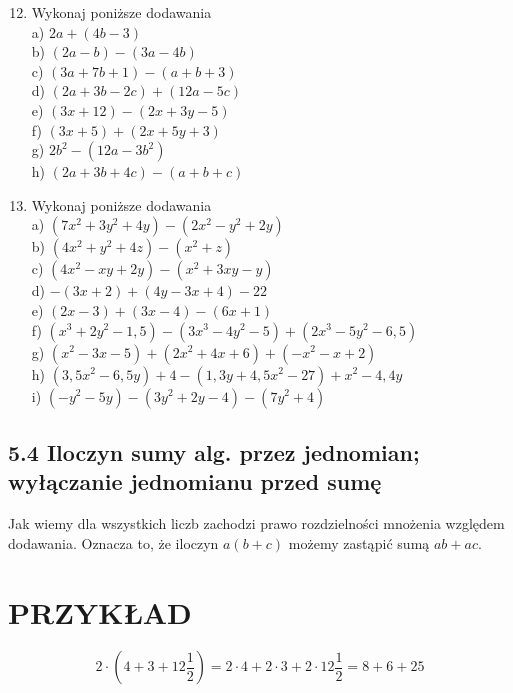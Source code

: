 \documentclass[10pt]{article}
\begin{document}
\begin{enumerate}
  \setcounter{enumi}{11}
  \item Wykonaj poniższe dodawania\\
a) \(2 a+(4 b-3)\)\\
b) \((2 a-b)-(3 a-4 b)\)\\
c) \((3 a+7 b+1)-(a+b+3)\)\\
d) \((2 a+3 b-2 c)+(12 a-5 c)\)\\
e) \((3 x+12)-(2 x+3 y-5)\)\\
f) \((3 x+5)+(2 x+5 y+3)\)\\
g) \(2 b^{2}-\left(12 a-3 b^{2}\right)\)\\
h) \((2 a+3 b+4 c)-(a+b+c)\)
  \item Wykonaj poniższe dodawania\\
a) \(\left(7 x^{2}+3 y^{2}+4 y\right)-\left(2 x^{2}-y^{2}+2 y\right)\)\\
b) \(\left(4 x^{2}+y^{2}+4 z\right)-\left(x^{2}+z\right)\)\\
c) \(\left(4 x^{2}-x y+2 y\right)-\left(x^{2}+3 x y-y\right)\)\\
d) \(-(3 x+2)+(4 y-3 x+4)-22\)\\
e) \((2 x-3)+(3 x-4)-(6 x+1)\)\\
f) \(\left(x^{3}+2 y^{2}-1,5\right)-\left(3 x^{3}-4 y^{2}-5\right)+\left(2 x^{3}-5 y^{2}-6,5\right)\)\\
g) \(\left(x^{2}-3 x-5\right)+\left(2 x^{2}+4 x+6\right)+\left(-x^{2}-x+2\right)\)\\
h) \(\left(3,5 x^{2}-6,5 y\right)+4-\left(1,3 y+4,5 x^{2}-27\right)+x^{2}-4,4 y\)\\
i) \(\left(-y^{2}-5 y\right)-\left(3 y^{2}+2 y-4\right)-\left(7 y^{2}+4\right)\)
\end{enumerate}

\subsection*{5.4 Iloczyn sumy alg. przez jednomian; wyłączanie jednomianu przed sumę}
Jak wiemy dla wszystkich liczb zachodzi prawo rozdzielności mnożenia względem dodawania. Oznacza to, że iloczyn \(a(b+c)\) możemy zastąpić sumą \(a b+a c\).

\section*{PRZYKŁAD}
\[
2 \cdot\left(4+3+12 \frac{1}{2}\right)=2 \cdot 4+2 \cdot 3+2 \cdot 12 \frac{1}{2}=8+6+25
\]
\end{document}
